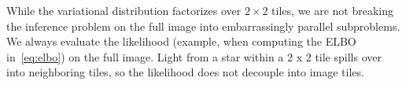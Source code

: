 While the variational distribution factorizes over $2 \times 2$ tiles, we are not breaking the inference problem on the full image into embarrassingly parallel subproblems. We always evaluate the likelihood (example, when computing the ELBO in~\eqref{eq:elbo}) on the full image. Light from a star within a 2 x 2 tile spills over into neighboring tiles, so the likelihood does not decouple into image tiles. 
